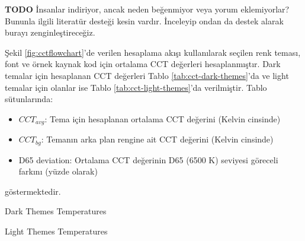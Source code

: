 \documentclass{article}
\begin{document}
\textbf{TODO} İnsanlar indiriyor, ancak neden beğenmiyor veya yorum eklemiyorlar? Bununla ilgili literatür desteği kesin
vardır. İnceleyip ondan da destek alarak burayı zenginleştireceğiz.

Şekil \ref{fig:cctflowchart}'de verilen hesaplama akışı kullanılarak seçilen renk teması, font ve örnek kaynak kod için
ortalama CCT değerleri hesaplanmıştır. Dark temalar için hesaplanan CCT değerleri Tablo \ref{tab:cct-dark-themes}'da ve
light temalar için olanlar ise Tablo \ref{tab:cct-light-themes}'da verilmiştir.  Tablo sütunlarında:

\begin{itemize}
  \item $CCT_{avg}$: Tema için hesaplanan ortalama CCT değerini (Kelvin cinsinde)
  \item $CCT_{bg}$: Temanın arka plan rengine ait CCT değerini (Kelvin cinsinde)
  \item D65 deviation: Ortalama CCT değerinin D65 (6500 K) seviyesi göreceli farkını (yüzde olarak)
\end{itemize}

göstermektedir.


\begin{table}[H]

	\caption{Dark Themes Temperatures}
  \label{tab:cct-dark-themes}
\end{table}

\begin{table}[H]

	\caption{Light Themes Temperatures}
  \label{tab:cct-light-themes}
\end{table}
\end{document}
